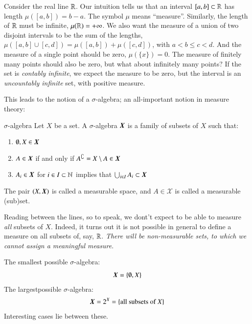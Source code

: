Consider the real line $\mathbb{R}$. Our intuition tells us that an interval $[a,b]\subset\mathbb{R}$ has length $\mu([a,b])=b-a$. The symbol $\mu$ means ``measure''. Similarly, the length of $\mathbb{R}$ must be infinite, $\mu(\mathbb{R}) = +\infty$. We also want the measure of a union of two disjoint intervals to be the sum of the lengths, $\mu([a,b]\cup [c,d]) = \mu([a,b]) + \mu([c,d])$, with $a < b\leq c < d$. And the measure of a single point should be zero, $\mu(\{x\}) = 0$. The measure of finitely many points should also be zero, but what about infinitely many points? If the set is \emph{contably infinite}, we expect the measure to be zero, but the interval is an \emph{uncountably infinite} set, with positive measure.


This leads to the notion of a $\sigma$-algebra; an all-important notion in measure theory:
\begin{myDefinition}{$\sigma$-algebra}
Let $X$ be a set.
A $\sigma$-algebra $\boldsymbol{X}$ is a family of subsets of $X$ such that:
\begin{enumerate}
    \item $\emptyset, X \in \boldsymbol{X}$ 
    \item $A \in \boldsymbol{X}$ if and only if $A^\complement = X \setminus A \in \boldsymbol{X}$ 
    \item $A_i \in \boldsymbol{X}$ for $i \in I \subset\mathbb{N}$ implies that $\bigcup_{i \in I} A_i \subset \boldsymbol{X}$ 
\end{enumerate}
The pair $(X,\boldsymbol{X})$ is called a measurable space, and $A \in \mathcal{X}$ is called a measurable (sub)set.
\end{myDefinition}

Reading between the lines, so to speak, we dont't expect to be able to measure \emph{all} subsets of $X$. Indeed, it turns out it is not possible in general to define a measure on all subsets of, say, $\mathbb{R}$. \emph{There will be non-measurable sets, to which we cannot assign a meaningful measure}.


\begin{myExample}{}{}
The smallest possible $\sigma$-algebra: 
\begin{equation}
    \boldsymbol{X} = \{\emptyset, X\}
\end{equation}
The largestpossible $\sigma$-algebra: 
\begin{equation}
    \boldsymbol{X} = 2^X = \{ \text{all subsets of $X$} \}
\end{equation}
Interesting cases lie between these.
\end{myExample}

